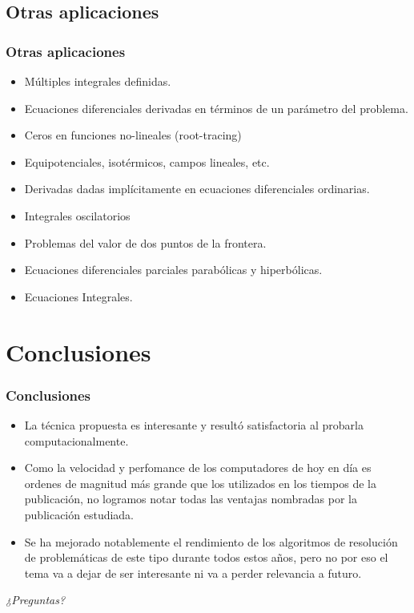 \documentclass{beamer}
\begin{document}
\subsection{Otras aplicaciones}
\frame
{
\frametitle{Otras aplicaciones}
\begin{itemize}
	\item Múltiples integrales definidas.
	\item Ecuaciones diferenciales derivadas en términos de un parámetro del problema.
	\item Ceros en funciones no-lineales (root-tracing)
	\item Equipotenciales, isotérmicos, campos lineales, etc.
	\item Derivadas dadas implícitamente en ecuaciones diferenciales ordinarias.
	\item Integrales oscilatorios
	\item Problemas del valor de dos puntos de la frontera.
	\item Ecuaciones diferenciales parciales parabólicas y hiperbólicas.
	\item Ecuaciones Integrales.
\end{itemize}
}

\section{Conclusiones}
\frame
{
\frametitle{Conclusiones}
\begin{itemize}
	\item La técnica propuesta es interesante y resultó satisfactoria al
probarla computacionalmente.
	\item Como la velocidad y perfomance de los computadores de hoy en día es
ordenes de magnitud más grande que los utilizados en los tiempos de la
publicación, no logramos notar todas las ventajas nombradas por la publicación
estudiada.
	\item Se ha mejorado notablemente el rendimiento de los algoritmos de
resolución de problemáticas de este tipo durante todos estos años, pero no por
eso el tema va a dejar de ser interesante ni va a perder relevancia a futuro.
\end{itemize}

}

\frame
{
\begin{center}
\begin{Huge}\textit{¿Preguntas?}\end{Huge}
\end{center}
}
\end{document}
